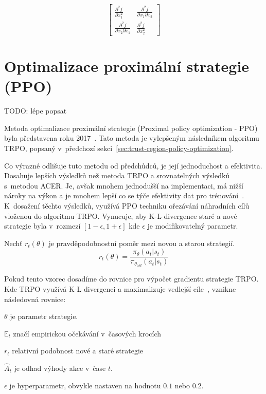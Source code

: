 \begin{equation}
  \begin{bmatrix}
     \frac{\partial^2 f}{\partial x_1^2} & \frac{\partial^2 f}{\partial x_1 \partial x_2} \\
     \frac{\partial^2 f}{\partial x_2 \partial x_1} & \frac{\partial^2 f}{\partial x_2^2}
   \end{bmatrix}
\end{equation}

\section{Optimalizace proximální strategie (PPO)}
\label{sec:proximalni-optimalizace-strategie}
{\color{red}TODO: lépe popsat}

Metoda optimalizace proximální strategie (Proximal policy optimization - PPO) byla představena roku 2017~\cite{PPO_paper}.
Tato metoda je vylepšeným následníkem algoritmu TRPO, popsaný v~předchozí sekci~\ref{sec:trust-region-policy-optimization}.

Co výrazné odlišuje tuto metodu od předchůdců, je její jednoduchost a efektivita.
Dosahuje lepších výsledků než metoda TRPO a srovnatelných výsledků s~metodou ACER\@.
Je, avšak mnohem jednodušší na implementaci, má nižší nároky na výkon a je mnohem lepší co se týče efektivity dat pro trénování~\cite{PPO_paper}.
K~dosažení těchto výsledků, využívá PPO techniku ořezávání náhradních cílů vloženou do algoritmu TRPO\@.
Vynucuje, aby K-L divergence staré a nové strategie byla v~rozmezí $[1-\epsilon, 1+\epsilon]$ kde $\epsilon$ je modifikovatelný parametr.

Nechť $r_t(\theta)$ je pravděpodobnostní poměr mezi novou a starou strategií.
\begin{equation}
  r_t(\theta) = \frac{\pi_\theta(a_t \vert s_t)}{\pi_{\theta_{old}}(a_t \vert s_t)}
\end{equation}

Pokud tento vzorec dosadíme do rovnice pro výpočet gradientu strategie TRPO.
Kde TRPO využívá K-L divergenci a maximalizuje vedlejší cíle~\cite{policy_gradients}, vznikne následovná rovnice:



\begin{myitemize}
  \item $\theta$ je parametr strategie.
  \item $\mathbb{E}_t$ značí empirickou očekávání v~časových krocích
  \item $r_t$ relativní podobnost nové a staré strategie~\cite{PPO_paper}
  \item $\hat{A}_t$ je odhad výhody akce v~čase $t$.
  \item $\epsilon$ je hyperparametr, obvykle nastaven na hodnotu $0.1$ nebo $0.2$.
\end{myitemize}


